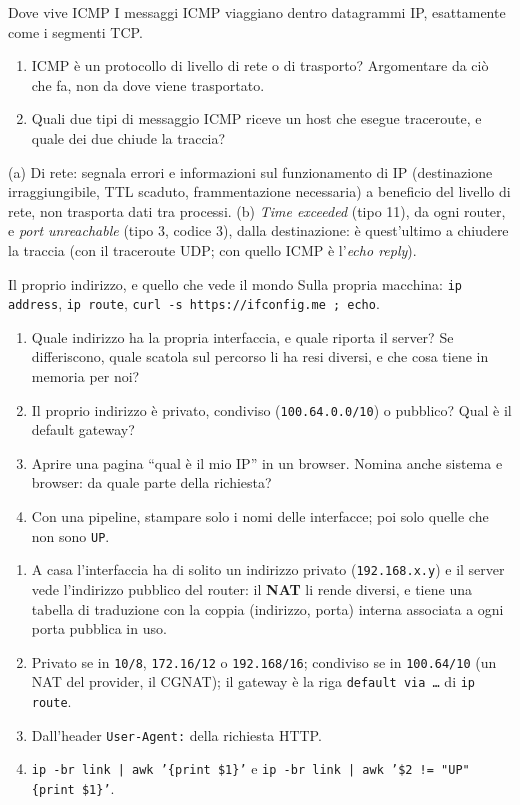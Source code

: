 \begin{esercizio}{Dove vive ICMP}
I messaggi ICMP viaggiano dentro datagrammi IP, esattamente come i segmenti TCP.
\begin{enumerate}[label=(\alph*)]
    \item ICMP è un protocollo di livello di rete o di trasporto? Argomentare da ciò che fa, non da dove viene trasportato.
    \item Quali due tipi di messaggio ICMP riceve un host che esegue traceroute, e quale dei due chiude la traccia?
\end{enumerate}

\svolgimento
(a) Di rete: segnala errori e informazioni sul funzionamento di IP (destinazione irraggiungibile, TTL scaduto, frammentazione
necessaria) a beneficio del livello di rete, non trasporta dati tra processi. (b) \emph{Time exceeded} (tipo 11), da ogni router, e
\emph{port unreachable} (tipo 3, codice 3), dalla destinazione: è quest'ultimo a chiudere la traccia (con il traceroute UDP; con quello
ICMP è l'\emph{echo reply}).
\end{esercizio}

\begin{esercizio}{Il proprio indirizzo, e quello che vede il mondo}
Sulla propria macchina: \texttt{ip address}, \texttt{ip route}, \texttt{curl -s https://ifconfig.me ; echo}.
\begin{enumerate}[label=(\alph*)]
    \item Quale indirizzo ha la propria interfaccia, e quale riporta il server? Se differiscono, quale scatola sul percorso li ha resi
          diversi, e che cosa tiene in memoria per noi?
    \item Il proprio indirizzo è privato, condiviso (\texttt{100.64.0.0/10}) o pubblico? Qual è il default gateway?
    \item Aprire una pagina ``qual è il mio IP'' in un browser. Nomina anche sistema e browser: da quale parte della richiesta?
    \item Con una pipeline, stampare solo i nomi delle interfacce; poi solo quelle che non sono \texttt{UP}.
\end{enumerate}

\svolgimento
\begin{enumerate}[label=(\alph*)]
    \item A casa l'interfaccia ha di solito un indirizzo privato (\texttt{192.168.x.y}) e il server vede l'indirizzo pubblico del router: il
          \textbf{NAT} li rende diversi, e tiene una tabella di traduzione con la coppia (indirizzo, porta) interna associata a ogni porta
          pubblica in uso.
    \item Privato se in \texttt{10/8}, \texttt{172.16/12} o \texttt{192.168/16}; condiviso se in \texttt{100.64/10} (un NAT del provider,
          il CGNAT); il gateway è la riga \texttt{default via \dots} di \texttt{ip route}.
    \item Dall'header \texttt{User-Agent:} della richiesta HTTP.
    \item \texttt{ip -br link | awk '\{print \$1\}'} e \texttt{ip -br link | awk '\$2 != "UP" \{print \$1\}'}.
\end{enumerate}
\end{esercizio}

